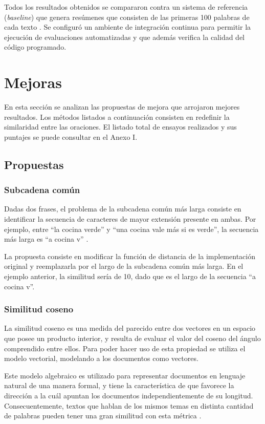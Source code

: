 \documentclass[a4paper]{article}
\begin{document}
Todos los resultados obtenidos se compararon contra un sistema de referencia (\textit{baseline}) que genera resúmenes que consisten de las primeras 100 palabras de cada texto \cite{baselines}.
Se configuró un ambiente de integración continua para permitir la ejecución de evaluaciones automatizadas y que además verifica la calidad del código programado. 


\section{Mejoras}
En esta sección se analizan las propuestas de mejora que arrojaron mejores resultados. Los métodos listados a continuación consisten en redefinir la similaridad entre las oraciones. El listado total de ensayos realizados y sus puntajes se puede consultar en el Anexo I.

\subsection{Propuestas}

\subsubsection{Subcadena común}
Dadas dos frases, el problema de la subcadena común más larga consiste en identificar la secuencia de caracteres de mayor extensión presente en ambas. Por ejemplo, entre “la cocina verde” y “una cocina vale más si es verde”, la secuencia más larga es “a cocina v” \cite{gusfield}.

La propuesta consiste en modificar la función de distancia de la implementación original y reemplazarla por el largo de la subcadena común más larga. En el ejemplo anterior, la similitud sería de 10, dado que es el largo de la secuencia “a cocina v”.


\subsubsection{Similitud coseno}
La similitud coseno es una medida del parecido entre dos vectores en un espacio que posee un producto interior, y resulta de evaluar el valor del coseno del ángulo comprendido entre ellos. Para poder hacer uso de esta propiedad se utiliza el modelo vectorial, modelando a los documentos como vectores.

Este modelo algebraico es utilizado para representar documentos en lenguaje natural de una manera formal, y tiene la característica de que favorece la dirección a la cuál apuntan los documentos independientemente de su longitud. Consecuentemente, textos que hablan de los mismos temas en distinta cantidad de palabras pueden tener una gran similitud con esta métrica \cite{singhal}. 
\end{document}
